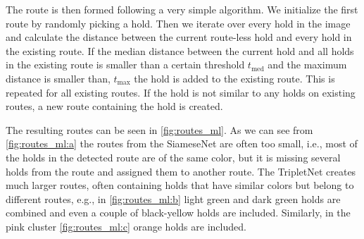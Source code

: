 \documentclass[final]{cvpr}
\begin{document}
The route is then formed following a very simple algorithm. We initialize the first route by randomly picking a hold. Then we iterate over every hold in the image and calculate the distance between the current route-less hold and every hold in the existing route. If the median distance between the current hold and all holds in the existing route is smaller than a certain threshold $t_{\mathrm{med}}$ and the maximum distance is smaller than, $t_{\mathrm{max}}$ the hold is added to the existing route. This is repeated for all existing routes. If the hold is not similar to any holds on existing routes, a new route containing the hold is created.

The resulting routes can be seen in \autoref{fig:routes_ml}. As we can see from \autoref{fig:routes_ml:a} the routes from the SiameseNet are often too small, i.e., most of the holds in the detected route are of the same color, but it is missing several holds from the route and assigned them to another route.
The TripletNet creates much larger routes, often containing holds that have similar colors but belong to different routes, e.g., in \autoref{fig:routes_ml:b} light green and dark green holds are combined and even a couple of black-yellow holds are included. Similarly, in the pink cluster \autoref{fig:routes_ml:c} orange holds are included.
\end{document}
